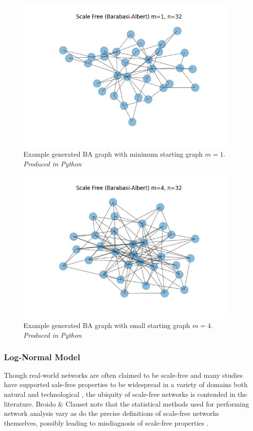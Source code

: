 \documentclass[
	a4paper, %
	10pt, %
	unnumberedsections, %
	twoside, %
]{LTJournalArticle}
\begin{document}
\begin{figure}[H] %
	\includegraphics[width=\linewidth]{Figures/ba/example_m1.jpg}
	\caption{Example generated BA graph with minimum starting graph \(m = 1\).  \emph{Produced in Python}}
	\label{fig:sf_example_m1}
\end{figure}

\begin{figure}[H] %
	\includegraphics[width=\linewidth]{Figures/ba/example_small.jpg}
	\caption{Example generated BA graph with small starting graph \(m = 4\). \emph{Produced in Python}}
	\label{fig:sf_example_small}
\end{figure}

\subsubsection{Log-Normal Model} 
Though real-world networks are often claimed to be scale-free and many studies have supported sale-free properties to be widespread in a variety of domains both natural and technological \cite{broido:19}, the ubiquity of scale-free networks is contended in the literature. Broido \& Clauset note that the statistical methods used for performing network analysis vary as do the precise definitions of scale-free networks themselves, possibly leading to misdiagnosis of scale-free properties \cite{broido:19}. \\
\end{document}
